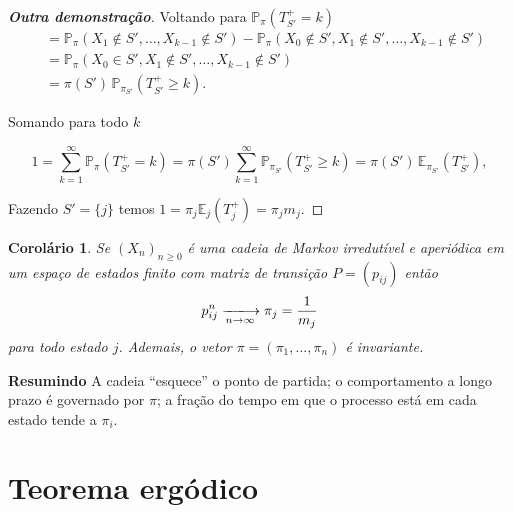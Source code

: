 \documentclass[12pt,letterpaper]{article}
\newtheorem{corolario} [teorema] {Corolário}
\begin{document}
\begin{proof}[\textbf{Outra demonstração}]
  Voltando para $\mathbb{P}_\pi(T_{S'}^+ = k)$
  \[
    \begin{aligned}
      &= \mathbb{P}_\pi(X_1 \notin {S'}, \ldots, X_{k-1} \notin {S'})
      - \mathbb{P}_\pi(X_0 \notin {S'}, X_1 \notin {S'}, \ldots, X_{k-1} \notin {S'})\\
      &= \mathbb{P}_\pi(X_0 \in {S'},X_1 \notin {S'}, \ldots, X_{k-1} \notin
      {S'})\\
      &=\pi({S'})\, \mathbb{P}_{\pi_{S'}}(T_{S'}^+ \ge k).
  \end{aligned}
  \]

  Somando para todo $k$
  
\[
1 = \sum_{k=1}^{\infty} \mathbb{P}_\pi(T_{S'}^+ = k)
= \pi({S'}) \sum_{k=1}^{\infty} \mathbb{P}_{\pi_{S'}}(T_{S'}^+ \ge k)
= \pi({S'})\, \mathbb{E}_{\pi_{S'}}(T_{S'}^+),
\]

Fazendo ${S'}=\{j\}$ temos $1=\pi_j \mathbb{E}_{j}(T_j^+) = \pi_j m_j$.
\end{proof}



\begin{corolario}
  Se $(X_n)_{n \ge 0}$ é uma cadeia de Markov irredutível e aperiódica
  em um espaço de estados finito com matriz de transição $P = (p_{ij})$
  então
  $$
  p_{ij}^n \xlongrightarrow[n\to\infty]{} \pi_j = \frac 1{m_j}
  $$
  para todo estado $j$. Ademais, o vetor
  $\mathsf{\pi} = (\pi_1,\dots,\pi_n)$ é invariante. 
\end{corolario}

\textbf{Resumindo} A cadeia ``esquece'' o ponto de partida; o
comportamento a longo prazo é governado por $\pi$; a fração do tempo em
que o processo está em cada estado tende a $\pi_i$.

\section{Teorema ergódico}
\end{document}
